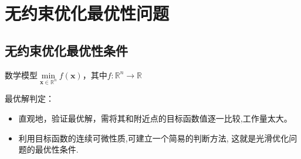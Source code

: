 \section{无约束优化最优性问题}
\subsection{无约束优化最优性条件}

数学模型$\min\limits_{\boldsymbol{x}\in\mathbb{R}^n}f(\boldsymbol{x})$，其中$f:\mathbb{R}^n\to \mathbb{R}$

\begin{note}
    最优解判定：
    \begin{itemize}
        \item 直观地，验证最优解，需将其和附近点的目标函数值逐一比较,工作量太大。
        \item 利用目标函数的连续可微性质,可建立一个简易的判断方法, 这就是光滑优化问题的最优性条件.
    \end{itemize}
\end{note}

